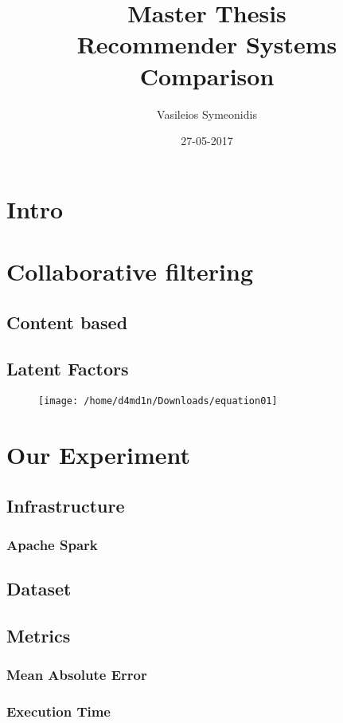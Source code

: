 \documentclass{article}
\title{Master Thesis \\ Recommender Systems Comparison}
\date{27-05-2017}
\author{Vasileios Symeonidis}
\begin{document}
\maketitle
\newpage
\tableofcontents
{}
\newpage
{}

\section{Intro}

\section{Collaborative filtering}
\subsection{Content based}
\subsection{Latent Factors}

\begin{figure}
\centering
\texttt{[image: /home/d4md1n/Downloads/equation01]}
\caption{}
\label{fig:equation01}
\end{figure}

\section{Our Experiment}
\subsection{Infrastructure}
\subsubsection{Apache Spark}
\subsection{Dataset}
\subsection{Metrics}
\subsubsection{Mean Absolute Error}
\subsubsection{Execution Time}
\cite{ApacheSpark:1}
\cite{RecommenderSystems:2}
\cite{MovieLens:3}
\end{document}
